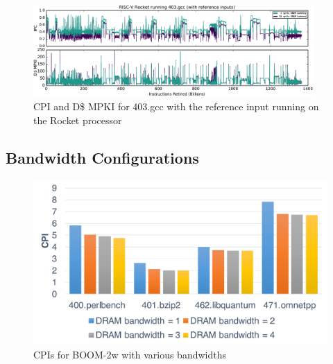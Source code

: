 \begin{figure}
	\centering
	\includegraphics[width=0.95\textwidth]{figures/403-gcc-ref.pdf}
	\caption{CPI and D\$ MPKI for 403.gcc with the reference input running on the Rocket processor}
	\label{fig:gcc_ref}
\end{figure}

\subsection{Bandwidth Configurations}


\begin{figure}[t]
	\centering
	\includegraphics[width=0.8\columnwidth]{figures/boom-bw.pdf}
	\caption{CPIs for BOOM-2w with various bandwidths}
	\label{fig:bandwidths}
\end{figure}

